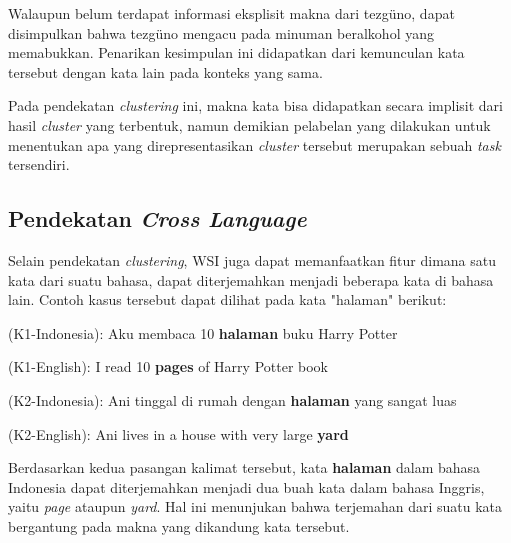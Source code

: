 	Walaupun belum terdapat informasi eksplisit makna dari tezg\"{u}no, dapat disimpulkan bahwa tezg\"{u}no mengacu pada minuman beralkohol yang memabukkan. Penarikan kesimpulan ini didapatkan dari kemunculan kata tersebut dengan kata lain pada konteks yang sama.
	
	Pada pendekatan \textit{clustering} ini, makna kata bisa didapatkan secara implisit dari hasil \textit{cluster} yang terbentuk, namun demikian pelabelan yang dilakukan untuk menentukan apa yang direpresentasikan \textit{cluster} tersebut merupakan sebuah \textit{task} tersendiri.
	
	\subsection{Pendekatan \textit{Cross Language}}
	Selain pendekatan \textit{clustering}, WSI juga dapat memanfaatkan fitur dimana satu kata dari suatu bahasa, dapat diterjemahkan menjadi beberapa kata di bahasa lain. Contoh kasus tersebut dapat dilihat pada kata "halaman" berikut:



	(K1-Indonesia): Aku membaca 10 \textbf{halaman} buku Harry Potter
	
	(K1-English): I read 10 \textbf{pages} of Harry Potter book
	
	(K2-Indonesia): Ani tinggal di rumah dengan \textbf{halaman} yang sangat luas
	
	(K2-English): Ani lives in a house with very large \textbf{yard}
	
	
	
	Berdasarkan kedua pasangan kalimat tersebut, kata \textbf{halaman} dalam bahasa Indonesia dapat diterjemahkan menjadi dua buah kata dalam bahasa Inggris, yaitu \textit{page} ataupun \textit{yard}. Hal ini menunjukan bahwa terjemahan dari suatu kata bergantung pada makna yang dikandung kata tersebut.


